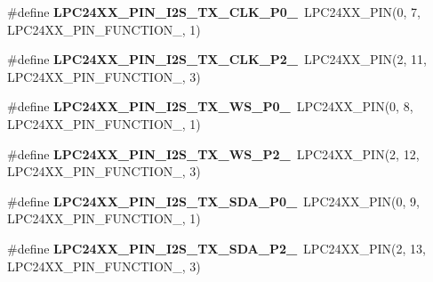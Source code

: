 \begin{DoxyCompactItemize}
\item 
\mbox{\label{group__lpc24xx__io_ga3967436c84302430e5c79d21fbb4fd85}} 
\#define {\bfseries L\+P\+C24\+X\+X\+\_\+\+P\+I\+N\+\_\+\+I2\+S\+\_\+\+T\+X\+\_\+\+C\+L\+K\+\_\+\+P0\+\_}~L\+P\+C24\+X\+X\+\_\+\+P\+IN(0, 7, L\+P\+C24\+X\+X\+\_\+\+P\+I\+N\+\_\+\+F\+U\+N\+C\+T\+I\+O\+N\+\_, 1)
\item 
\mbox{\label{group__lpc24xx__io_gad6035419f6d2e864089d7be48c29b9a2}} 
\#define {\bfseries L\+P\+C24\+X\+X\+\_\+\+P\+I\+N\+\_\+\+I2\+S\+\_\+\+T\+X\+\_\+\+C\+L\+K\+\_\+\+P2\+\_}~L\+P\+C24\+X\+X\+\_\+\+P\+IN(2, 11, L\+P\+C24\+X\+X\+\_\+\+P\+I\+N\+\_\+\+F\+U\+N\+C\+T\+I\+O\+N\+\_, 3)
\item 
\mbox{\label{group__lpc24xx__io_gaadcaff23babd6f67f4d1acb400bd35d1}} 
\#define {\bfseries L\+P\+C24\+X\+X\+\_\+\+P\+I\+N\+\_\+\+I2\+S\+\_\+\+T\+X\+\_\+\+W\+S\+\_\+\+P0\+\_}~L\+P\+C24\+X\+X\+\_\+\+P\+IN(0, 8, L\+P\+C24\+X\+X\+\_\+\+P\+I\+N\+\_\+\+F\+U\+N\+C\+T\+I\+O\+N\+\_, 1)
\item 
\mbox{\label{group__lpc24xx__io_ga2fe2d95c49020beb62408be78c25dbff}} 
\#define {\bfseries L\+P\+C24\+X\+X\+\_\+\+P\+I\+N\+\_\+\+I2\+S\+\_\+\+T\+X\+\_\+\+W\+S\+\_\+\+P2\+\_}~L\+P\+C24\+X\+X\+\_\+\+P\+IN(2, 12, L\+P\+C24\+X\+X\+\_\+\+P\+I\+N\+\_\+\+F\+U\+N\+C\+T\+I\+O\+N\+\_, 3)
\item 
\mbox{\label{group__lpc24xx__io_ga9813bb5c338a8ae2acb285e1b941ad55}} 
\#define {\bfseries L\+P\+C24\+X\+X\+\_\+\+P\+I\+N\+\_\+\+I2\+S\+\_\+\+T\+X\+\_\+\+S\+D\+A\+\_\+\+P0\+\_}~L\+P\+C24\+X\+X\+\_\+\+P\+IN(0, 9, L\+P\+C24\+X\+X\+\_\+\+P\+I\+N\+\_\+\+F\+U\+N\+C\+T\+I\+O\+N\+\_, 1)
\item 
\mbox{\label{group__lpc24xx__io_gadc9c8961f0a19c32529df473e13726fa}} 
\#define {\bfseries L\+P\+C24\+X\+X\+\_\+\+P\+I\+N\+\_\+\+I2\+S\+\_\+\+T\+X\+\_\+\+S\+D\+A\+\_\+\+P2\+\_}~L\+P\+C24\+X\+X\+\_\+\+P\+IN(2, 13, L\+P\+C24\+X\+X\+\_\+\+P\+I\+N\+\_\+\+F\+U\+N\+C\+T\+I\+O\+N\+\_, 3)
\end{DoxyCompactItemize}
